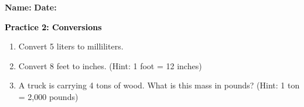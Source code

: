 \documentclass[12pt, letterpaper, fleqn]{article}
\begin{document}
\textbf{Name:} \underline{\hspace{5cm}}
\hfill
\textbf{Date:} \underline{\hspace{3cm}}\\

\begin{tcolorbox}[colback=customteal!20]
    \large\textcolor{black}{\textbf{Practice 2: Conversions}}
\end{tcolorbox}
\begin{enumerate}[itemsep=3.5cm, leftmargin=0.6cm]
\item Convert 5 liters to milliliters.
\vspace{3.5cm}
\item Convert 8 feet to inches. (Hint: 1 foot = 12 inches)
\vspace{3.5cm}
\item A truck is carrying 4 tons of wood. What is this mass in pounds? (Hint: 1 ton = 2,000 pounds)
\end{enumerate}
\end{document}
